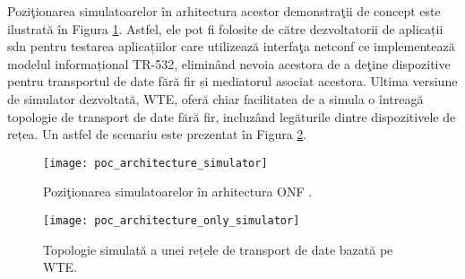 Poziţionarea simulatoarelor în arhitectura acestor demonstraţii de concept este ilustrată în Figura \ref{fig:poc_architecture_simulator}. Astfel, ele pot fi folosite de către dezvoltatorii de aplicații \gls{sdn} pentru testarea aplicațiilor care utilizează interfaţa \gls{netconf} ce implementează modelul informațional TR-532, eliminând nevoia acestora de a deţine dispozitive pentru transportul de date fără fir și mediatorul asociat acestora. Ultima versiune de simulator dezvoltată, WTE, oferă chiar facilitatea de a simula o întreagă topologie de transport de date fără fir, incluzând legăturile dintre dispozitivele de rețea. Un astfel de scenariu este prezentat în Figura \ref{fig:poc_architecture_only_simulator}.

\begin{figure}[h]
	\centering
	\texttt{[image: poc\_architecture\_simulator]}
	\caption{Poziţionarea simulatoarelor în arhitectura ONF \cite{onf2015_poc1, onf2016_poc2, onf2016_poc3}.}
	\label{fig:poc_architecture_simulator}
\end{figure}
\begin{figure}[h]
	\centering
	\texttt{[image: poc\_architecture\_only\_simulator]}
	\caption{Topologie simulată a unei rețele de transport de date bazată pe WTE.}
	\label{fig:poc_architecture_only_simulator}
\end{figure}
